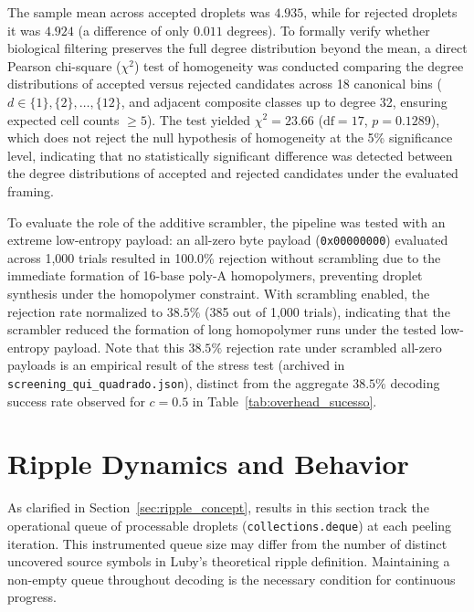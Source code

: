 The sample mean across accepted droplets was $4.935$, while for rejected droplets it was $4.924$ (a difference of only $0.011$ degrees). To formally verify whether biological filtering preserves the full degree distribution beyond the mean, a direct Pearson chi-square ($\chi^2$) test of homogeneity was conducted comparing the degree distributions of accepted versus rejected candidates across 18 canonical bins ($d \in \{1\}, \{2\}, \ldots, \{12\}$, and adjacent composite classes up to degree 32, ensuring expected cell counts $\ge 5$). The test yielded $\chi^2 = 23.66$ ($\text{df} = 17$, $p = 0.1289$), which does not reject the null hypothesis of homogeneity at the 5\% significance level, indicating that no statistically significant difference was detected between the degree distributions of accepted and rejected candidates under the evaluated framing.

To evaluate the role of the additive scrambler, the pipeline was tested with an extreme low-entropy payload: an all-zero byte payload (\texttt{0x00000000}) evaluated across 1,000 trials resulted in 100.0\% rejection without scrambling due to the immediate formation of 16-base poly-A homopolymers, preventing droplet synthesis under the homopolymer constraint. With scrambling enabled, the rejection rate normalized to $38.5\%$ (385 out of 1,000 trials), indicating that the scrambler reduced the formation of long homopolymer runs under the tested low-entropy payload. Note that this $38.5\%$ rejection rate under scrambled all-zero payloads is an empirical result of the stress test (archived in \texttt{screening\_qui\_quadrado.json}), distinct from the aggregate $38.5\%$ decoding success rate observed for $c = 0.5$ in Table~\ref{tab:overhead_sucesso}.

\section{Ripple Dynamics and Behavior}
\label{sec:results_ripple_behavior}

As clarified in Section~\ref{sec:ripple_concept}, results in this section track the operational queue of processable droplets (\texttt{collections.deque}) at each peeling iteration. This instrumented queue size may differ from the number of distinct uncovered source symbols in Luby's theoretical ripple definition. Maintaining a non-empty queue throughout decoding is the necessary condition for continuous progress.

